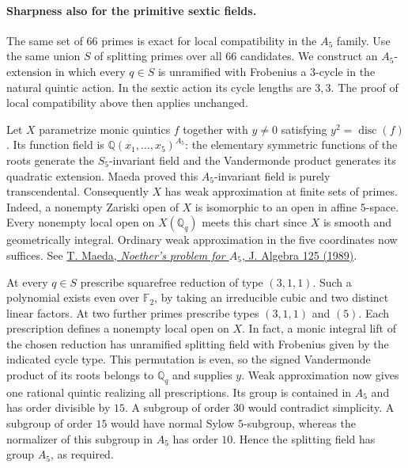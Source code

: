 \paragraph{Sharpness also for the primitive sextic fields.}
The same set of 66 primes is exact for local compatibility in the $A_5$
family. Use the same union $S$ of splitting primes over all $66$ candidates. We construct an $A_5$-extension in
which every $q\in S$ is unramified with Frobenius a $3$-cycle in the
natural quintic action. In the sextic action its cycle lengths are $3,3$.
The proof of local compatibility above then applies unchanged.

Let $X$ parametrize monic quintics $f$ together with $y\ne0$ satisfying
$y^2=\operatorname{disc}(f)$. Its function field is
$\mathbb Q(x_1,\ldots,x_5)^{A_5}$: the elementary symmetric functions of
the roots generate the $S_5$-invariant field and the Vandermonde product
generates its quadratic extension. Maeda proved this $A_5$-invariant
field is purely transcendental. Consequently $X$ has weak approximation
at finite sets of primes. Indeed, a nonempty Zariski open of $X$ is
isomorphic to an open in affine $5$-space. Every nonempty local open on
$X(\mathbb Q_q)$ meets this chart since $X$ is smooth and geometrically
integral. Ordinary weak approximation in the five coordinates now
suffices. See \href{https://doi.org/10.1016/0021-8693(89)90174-9}
{T. Maeda, \emph{Noether's problem for $A_5$}, J. Algebra 125 (1989)}.

At every $q\in S$ prescribe squarefree reduction of type $(3,1,1)$.
Such a polynomial exists even over $\mathbb F_2$, by taking an irreducible
cubic and two distinct linear factors. At two further primes prescribe
types $(3,1,1)$ and $(5)$. Each prescription defines a nonempty local
open on $X$. In fact, a monic integral lift of the chosen reduction has
unramified splitting field with Frobenius given by the indicated cycle
type. This permutation is even, so the signed Vandermonde product of its
roots belongs to $\mathbb Q_q$ and supplies $y$. Weak approximation now
gives one rational quintic realizing all prescriptions. Its group is
contained in $A_5$ and has order divisible by $15$. A subgroup of order
$30$ would contradict simplicity. A subgroup of order $15$ would have
normal Sylow $5$-subgroup, whereas the normalizer of this subgroup in
$A_5$ has order $10$. Hence the splitting field has group $A_5$, as required.
